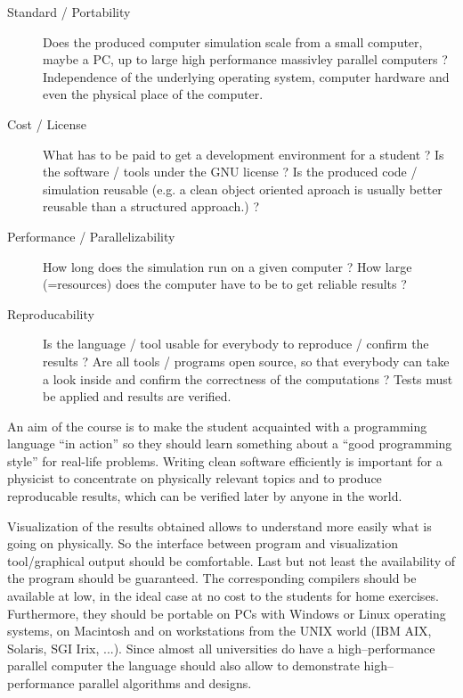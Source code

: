 \begin{description}
\item[Standard / Portability] Does the produced computer simulation scale
        from a small computer, maybe a PC, up to large high performance
        massivley parallel computers ? \newline
        Independence of the underlying operating system, computer hardware
        and even the physical place of the computer. 
\item[Cost / License] What has to be paid to get a development environment
        for a student ? \newline
        Is the software / tools under the GNU license ? \newline
        Is the produced code / simulation reusable (e.g. a clean 
        object oriented aproach is usually better reusable than a structured
        approach.) ?
\item[Performance / Parallelizability] How long does the simulation run
        on a given computer ? \newline
        How large (=resources) 
        does the computer have to be to get reliable results ?
\item[Reproducability] Is the language / tool usable for everybody to
        reproduce / confirm the results ? \newline
        Are all tools / programs open source, so that everybody can
        take a look inside and confirm the correctness of the 
        computations ? \newline
        Tests must be applied and results are verified.
\end{description}

An aim of the course is to make the student acquainted with a 
programming language ``in action'' so they should learn something 
about a ``good 
programming style'' for real-life problems. Writing clean software 
efficiently is important for a physicist to 
concentrate on physically relevant topics and to produce reproducable 
results, which can be verified later by anyone in the world.

Visualization of the results 
obtained allows to understand more easily what is going on physically. So 
the interface between program and visualization tool/graphical output should
be comfortable. Last but not least the availability of the program should be
guaranteed. The corresponding compilers should be available at low, in the 
ideal case at no cost to the students for home exercises. Furthermore, they
should be portable on PCs with Windows or Linux operating systems, on Macintosh
and on workstations from the UNIX world (IBM AIX, Solaris, SGI Irix, ...).
Since almost all universities do have a high--performance parallel computer 
the language should also allow to demonstrate high--performance parallel 
algorithms and designs.

